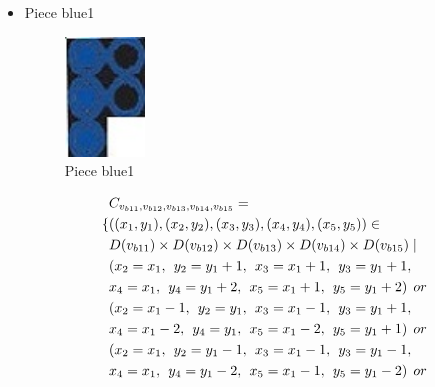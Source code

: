 \begin{appendices}
\begin{itemize}
  \item Piece blue1 
\begin{figure}[H]
    \centering
    \includegraphics[width=0.2\textwidth]{figs/blue1.jpg}
    \caption{Piece blue1}
\end{figure}
  \begin{align*}
&\Cons{b11}{b12}{b13}{b14}{b15}=
\\\{&((x_{1},y_{1}),(x_{2},y_{2}),(x_{3},y_{3}),(x_{4},y_{4}),(x_{5},y_{5}))\in \\
&\Domain {b11} \times \Domain{b12}\times \Domain{b13}\times \Domain{b14}\times \Domain{b15} \mid\\
&(x_{2} = x_{1},\hspace{1ex}y_{2} = y_{1}+1,\hspace{1ex}x_{3} = x_{1}+1,\hspace{1ex}y_{3} = y_{1}+1,
\\&x_{4} = x_{1},\hspace{1ex}y_{4} = y_{1}+2,\hspace{1ex}x_{5} = x_{1}+1,\hspace{1ex}y_{5} = y_{1}+2)\hspace{1ex} or \\
&(x_{2} = x_{1}-1 ,\hspace{1ex}y_{2} = y_{1},\hspace{1ex}x_{3} = x_{1}-1,\hspace{1ex}y_{3} = y_{1}+1,
\\&x_{4} = x_{1}-2,\hspace{1ex}y_{4} = y_{1},\hspace{1ex}x_{5} = x_{1}-2,\hspace{1ex}y_{5} = y_{1}+1)\hspace{1ex} or \\
&(x_{2} = x_{1} ,\hspace{1ex}y_{2} = y_{1}-1,\hspace{1ex}x_{3} = x_{1}-1,\hspace{1ex}y_{3} = y_{1}-1,
\\&x_{4} = x_{1},\hspace{1ex}y_{4} = y_{1}-2,\hspace{1ex}x_{5} = x_{1}-1,\hspace{1ex}y_{5} = y_{1}-2)\hspace{1ex} or \\

\end{align*}
\end{itemize}
\end{appendices}
